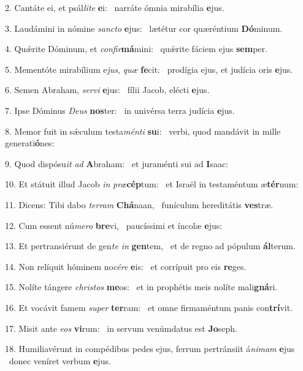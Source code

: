 2. Cantáte ei, et psál\textit{li}\textit{te} \textbf{e}i: \ast\  narráte ómnia mirabília \textbf{e}jus.\

3. Laudámini in nómine \textit{sanc}\textit{to} \textbf{e}jus: \ast\  lætétur cor quæréntium \textbf{Dó}minum.\

4. Quǽrite Dóminum, et \textit{con}\textit{fir}\textbf{má}mini: \ast\  quǽrite fáciem ejus \textbf{sem}per.\

5. Mementóte mirabílium e\textit{jus}, \textit{quæ} \textbf{fe}cit: \ast\  prodígia ejus, et judícia oris \textbf{e}jus.\

6. Semen Abraham, \textit{ser}\textit{vi} \textbf{e}jus: \ast\  fílii Jacob, elécti \textbf{e}jus.\

7. Ipse Dóminus \textit{De}\textit{us} \textbf{nos}ter: \ast\  in univérsa terra judícia \textbf{e}jus.\

8. Memor fuit in sǽculum testa\textit{mén}\textit{ti} \textbf{su}i: \ast\  verbi, quod mandávit in mille generati\textbf{ó}nes:\

9. Quod dispósu\textit{it} \textit{ad} \textbf{A}braham: \ast\  et juraménti sui ad \textbf{I}saac:\

10. Et státuit illud Jacob \textit{in} \textit{præ}\textbf{cép}tum: \ast\  et Israël in testaméntum æ\textbf{tér}num:\

11. Dicens: Tibi dabo \textit{ter}\textit{ram} \textbf{Chá}naan, \ast\  funículum hereditátis \textbf{ves}træ.\

12. Cum essent nú\textit{me}\textit{ro} \textbf{bre}vi, \ast\  paucíssimi et íncolæ \textbf{e}jus:\

13. Et pertransiérunt de gen\textit{te} \textit{in} \textbf{gen}tem, \ast\  et de regno ad pópulum \textbf{ál}terum.\

14. Non relíquit hóminem no\textit{cé}\textit{re} \textbf{e}is: \ast\  et corrípuit pro eis \textbf{re}ges.\

15. Nolíte tángere \textit{chris}\textit{tos} \textbf{me}os: \ast\  et in prophétis meis nolíte mali\textbf{gná}ri.\

16. Et vocávit famem \textit{su}\textit{per} \textbf{ter}ram: \ast\  et omne firmaméntum panis con\textbf{trí}vit.\

17. Misit ante \textit{e}\textit{os} \textbf{vi}rum: \ast\  in servum venúmdatus est \textbf{Jo}seph.\

18. Humiliavérunt in compédibus pedes ejus, ferrum pertránsiit á\textit{ni}\textit{mam} \textbf{e}jus \ast\  donec veníret verbum \textbf{e}jus.\

